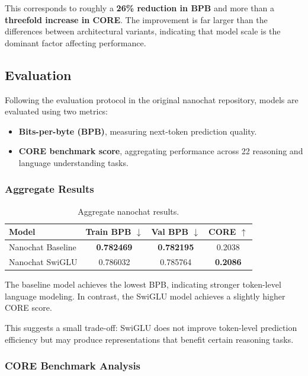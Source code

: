 This corresponds to roughly a \textbf{26\% reduction in BPB} and more
than a \textbf{threefold increase in CORE}. The improvement is far larger
than the differences between architectural variants, indicating that
model scale is the dominant factor affecting performance.

\subsection{Evaluation}

Following the evaluation protocol in the original nanochat repository,
models are evaluated using two metrics:

\begin{itemize}
\item \textbf{Bits-per-byte (BPB)}, measuring next-token prediction quality.
\item \textbf{CORE benchmark score}, aggregating performance across
22 reasoning and language understanding tasks.
\end{itemize}

\subsubsection{Aggregate Results}

\begin{table}[H]
\centering
\begin{tabular}{lccc}
\hline
\textbf{Model} & \textbf{Train BPB $\downarrow$} & \textbf{Val BPB $\downarrow$} & \textbf{CORE $\uparrow$} \\
\hline
Nanochat Baseline & \textbf{0.782469} & \textbf{0.782195} & 0.2038 \\
Nanochat SwiGLU & 0.786032 & 0.785764 & \textbf{0.2086} \\
\hline
\end{tabular}
\caption{Aggregate nanochat results.}
\label{tab:part4_aggregate_results}
\end{table}

The baseline model achieves the lowest BPB, indicating stronger
token-level language modeling. In contrast, the SwiGLU model achieves a
slightly higher CORE score.

This suggests a small trade-off: SwiGLU does not improve token-level
prediction efficiency but may produce representations that benefit
certain reasoning tasks.

\subsubsection{CORE Benchmark Analysis}

